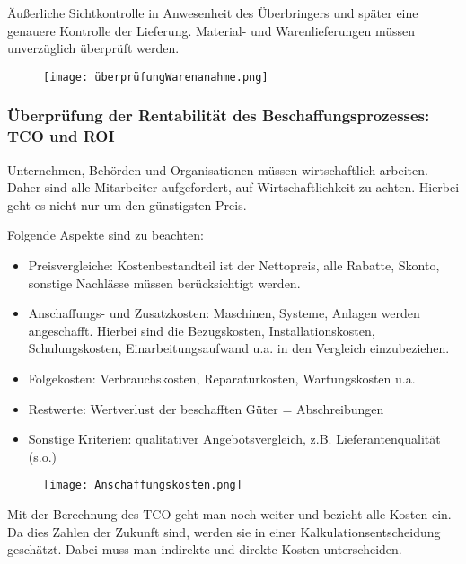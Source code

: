 \documentclass[asp1.tex]{subfiles}
\begin{document}
Äußerliche Sichtkontrolle in Anwesenheit des Überbringers und später eine genauere Kontrolle der Lieferung. Material- und Warenlieferungen müssen unverzüglich überprüft werden.

\begin{figure}[H]
    \begin{center}
        \texttt{[image: überprüfungWarenanahme.png]}
    \end{center}
    \label{fig:überprüfungWarenanahme.png}
\end{figure}

\subsubsection{Überprüfung der Rentabilität des Beschaffungsprozesses: TCO und ROI}

Unternehmen, Behörden und Organisationen müssen wirtschaftlich arbeiten. Daher sind alle Mitarbeiter aufgefordert, auf Wirtschaftlichkeit zu achten. Hierbei geht es nicht nur um den günstigsten Preis.

Folgende Aspekte sind zu beachten:
\begin{itemize}
    \item Preisvergleiche: Kostenbestandteil ist der Nettopreis, alle Rabatte, Skonto, sonstige Nachlässe müssen berücksichtigt werden.
    \item Anschaffungs- und Zusatzkosten: Maschinen, Systeme, Anlagen werden angeschafft. Hierbei sind die Bezugskosten, Installationskosten, Schulungskosten, Einarbeitungsaufwand u.a. in den Vergleich einzubeziehen.
    \item Folgekosten: Verbrauchskosten, Reparaturkosten, Wartungskosten u.a.
    \item Restwerte: Wertverlust der beschafften Güter = Abschreibungen
    \item Sonstige Kriterien: qualitativer Angebotsvergleich, z.B. Lieferantenqualität (s.o.)
\end{itemize}

\begin{figure}[H]
    \begin{center}
        \texttt{[image: Anschaffungskosten.png]}
    \end{center}
    \label{fig:Anschaffungskosten.png}
\end{figure}

Mit der Berechnung des TCO geht man noch weiter und bezieht alle Kosten ein.
Da dies Zahlen der Zukunft sind, werden sie in einer Kalkulationsentscheidung geschätzt. Dabei muss man indirekte und direkte Kosten unterscheiden.
\end{document}
